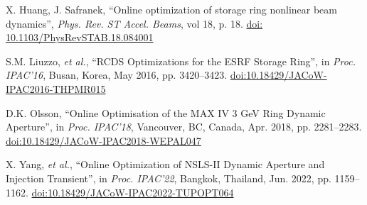 \documentclass[a4paper,
               keeplastbox,   %
               ]{jacow}
\begin{document}
\begin{thebibliography}{9}
		X. Huang, J. Safranek,
		\textquotedblleft{Online optimization of storage ring nonlinear beam dynamics}\textquotedblright,
		\emph{Phys. Rev. ST Accel. Beams}, vol 18, p. 18.
        \url{doi: 10.1103/PhysRevSTAB.18.084001} 
 
        S.M. Liuzzo, \emph{et al.},
        \textquotedblleft{RCDS Optimizations for the ESRF Storage Ring}\textquotedblright,
        in \emph{Proc. IPAC’16}, Busan, Korea, May 2016, pp. 3420--3423.
       \url{doi:10.18429/JACoW-IPAC2016-THPMR015}   
    
       D.K. Olsson,
       \textquotedblleft{Online Optimisation of the MAX IV 3 GeV Ring Dynamic Aperture}\textquotedblright,
       in \emph{Proc. IPAC'18}, Vancouver, BC, Canada, Apr. 2018, pp. 2281--2283.
       \url{doi:10.18429/JACoW-IPAC2018-WEPAL047}
    
        X. Yang, \emph{et al.},
       \textquotedblleft{Online Optimization of NSLS-II Dynamic Aperture and Injection Transient}\textquotedblright,
        in \emph{Proc. IPAC'22}, Bangkok, Thailand, Jun. 2022, pp. 1159--1162.
       \url{doi:10.18429/JACoW-IPAC2022-TUPOPT064}
    
   
	\end{thebibliography}

%
% 

%
\end{document}
